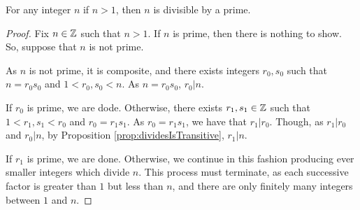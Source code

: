 \guard






\begin{prop}
\label{prop:everyPositiveNonUnitIntegerDivisibleByAPrime}
  For any integer $n$ if $n>1$, then $n$ is divisible by a prime.
\end{prop}
\begin{proof}
  Fix $n\in\mathbb{Z}$ such that $n>1$.
  If $n$ is prime, then there is nothing to show.
  So, suppose that $n$ is not prime.

  As $n$ is not prime, it is composite, and there exists integers $r_0,s_0$ such that $n=r_0s_0$ and $1<r_0,s_0<n$.
  As $n=r_0s_0$, $r_0\vert n$.

  If $r_0$ is prime, we are dode.
  Otherwise, there exists $r_1,s_1\in\mathbb{Z}$ such that $1<r_1,s_1<r_0$ and $r_0=r_1s_1$.
  As $r_0=r_1s_1$, we have that $r_1\vert r_0$.
  Though, as $r_1\vert r_0$ and $r_0\vert n$, by Proposition \ref{prop:dividesIsTransitive}, $r_1\vert n$.

  If $r_1$ is prime, we are done.
  Otherwise, we continue in this fashion producing ever smaller integers which divide $n$.
  This process must terminate, as each successive factor is greater than $1$ but less than $n$, and there are only finitely many integers between $1$ and $n$.
\end{proof}

